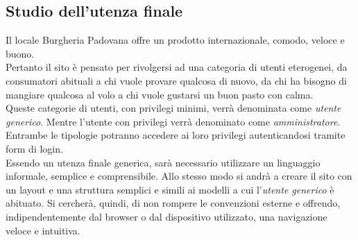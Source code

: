 \subsection{Studio dell'utenza finale}
Il locale Burgheria Padovana offre un prodotto internazionale, comodo, veloce e buono.\\
Pertanto il sito è pensato per rivolgersi ad una categoria di utenti eterogenei, da consumatori abituali a chi vuole provare qualcosa di nuovo, da chi ha bisogno di mangiare qualcosa al volo a chi vuole gustarsi un buon pasto con calma.\\
Queste categorie di utenti, con privilegi minimi, verrà denominata come \emph{utente generico}.
Mentre l'utente con privilegi verrà denominato come \emph{amministratore}.\\ 
Entrambe le tipologie potranno accedere ai loro privilegi autenticandosi tramite form di login.\\
Essendo un utenza finale generica, sarà necessario utilizzare un linguaggio informale, semplice e comprensibile.
Allo stesso modo si andrà a creare il sito con un layout e una struttura semplici e simili ai modelli a cui l'\emph{utente generico} è abituato.
Si cercherà, quindi, di non rompere le convenzioni esterne e offrendo, indipendentemente dal browser o dal dispositivo utilizzato, una navigazione veloce e intuitiva.\\